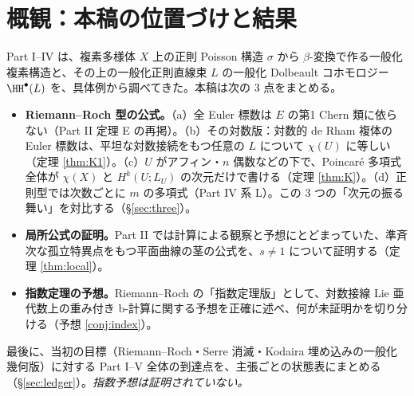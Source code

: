 \section{概観：本稿の位置づけと結果}
Part I--IV は、複素多様体 $X$ 上の正則 Poisson 構造 $\sigma$ から $\beta$-変換で作る一般化複素構造と、その上の一般化正則直線束 $L$ の一般化 Dolbeault コホモロジー $\HH^\bullet(L)$ を、具体例から調べてきた。本稿は次の 3 点をまとめる。

\begin{itemize}
\item \textbf{Riemann--Roch 型の公式。}（a）全 Euler 標数は $E$ の第1 Chern 類に依らない（Part II 定理 E の再掲）。（b）その対数版：対数的 de Rham 複体の Euler 標数は、平坦な対数接続をもつ任意の $L$ について $\chi(U)$ に等しい（定理 \ref{thm:K1}）\tP。（c）$U$ がアフィン・$n$ 偶数などの下で、Poincaré 多項式全体が $\chi(X)$ と $H^k(U;L_U)$ の次元だけで書ける（定理 \ref{thm:K}）\tP\tV。（d）正則型では次数ごとに $m$ の多項式（Part IV 系 L）。この 3 つの「次元の振る舞い」を対比する（\S\ref{sec:three}）。
\item \textbf{局所公式の証明。}Part II では計算による観察と予想にとどまっていた、準斉次な孤立特異点をもつ平面曲線の茎の公式を、$s\ne1$ について証明する（定理 \ref{thm:local}）\tP。
\item \textbf{指数定理の予想。}Riemann--Roch の「指数定理版」として、対数接線 Lie 亜代数上の重み付き b-計算に関する予想を正確に述べ、何が未証明かを切り分ける（予想 \ref{conj:index}）\tK。
\end{itemize}
最後に、当初の目標（Riemann--Roch・Serre 消滅・Kodaira 埋め込みの一般化幾何版）に対する Part I--V 全体の到達点を、主張ごとの状態表にまとめる（\S\ref{sec:ledger}）。\emph{指数予想は証明されていない。}

